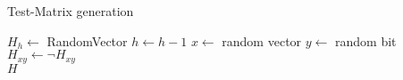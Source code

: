 \begin{algorithm}[H]
    \caption{Test-Matrix generation}
    \label{alg:test}
    \begin{algorithmic}[1]
                \State $H_h \gets $ RandomVector
                \State $h \gets h - 1$
            \EndWhile
                \State $x \gets $ random vector
                \State $y \gets $ random bit
                \State $H_{xy} \gets \lnot H_{xy}$
            \EndWhile \\
            \Return $H$
        \EndProcedure
    \end{algorithmic}
\end{algorithm}